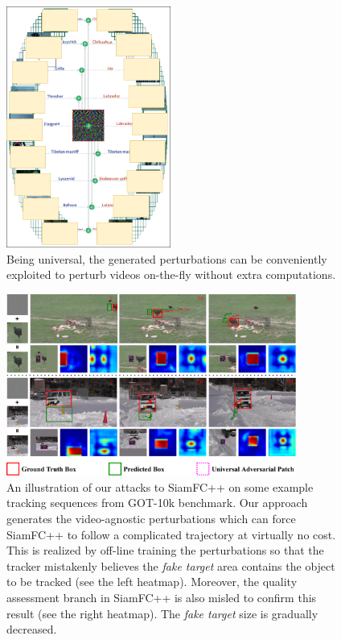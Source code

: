 \documentclass[journal]{IEEEtran}
\begin{document}
\begin{figure}[t]
  \centering
  \includegraphics[width=0.48\textwidth]{images/UAP.png}
  \caption{Being universal, the generated perturbations can be conveniently exploited to perturb videos on-the-fly without extra computations.} 
  \label{fig:UAP}
\end{figure}

\begin{figure}[t]
  \centering
  \includegraphics[width=0.85\textwidth]{images/1_v8.pdf}
  \caption{An illustration of our attacks to SiamFC++ on some example tracking sequences from GOT-10k benchmark. Our approach generates the video-agnostic perturbations which can force SiamFC++ to follow a complicated trajectory at virtually no cost. This is realized by off-line training the perturbations so that the tracker mistakenly believes the \textit{fake target} area contains the object to be tracked (see the left heatmap). Moreover, the quality assessment branch in SiamFC++ is also misled to confirm this result (see the right heatmap). The \textit{fake target} size is gradually decreased.} 
  \label{fig:1}
\end{figure}
\end{document}
